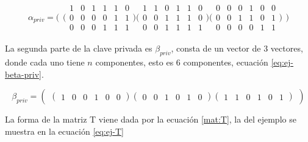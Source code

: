 \begin{equation}\label{eq:ej-alpha-priv}
{\alpha_{priv}} = 
	\Bigg(\begin{matrix}
	\Big(\begin{smallmatrix}
		1 & 0 & 1 & 1 & 1 & 0\\
		0 & 0 & 0 & 0 & 1 & 1\\
		0 & 0 & 0 & 1 & 1 & 1
	\end{smallmatrix}\Big)
		
	\Big(\begin{smallmatrix}
		1 & 1 & 0 & 1 & 1 & 0\\
		0 & 0 & 1 & 1 & 1 & 0\\
		0 & 0 & 1 & 1 & 1 & 1
	\end{smallmatrix}\Big)
	
	\Big(\begin{smallmatrix}
		0 & 0 & 0 & 1 & 0 & 0\\
		0 & 0 & 1 & 1 & 0 & 1\\
		0 & 0 & 0 & 0 & 1 & 1
	\end{smallmatrix}\Big)
	\end{matrix}\Bigg)
\end{equation}

La segunda parte de la clave privada es $\beta_{priv}$, consta de un vector de $3$ vectores, donde cada uno tiene $n$ componentes, esto es $6$ componentes, ecuación \ref{eq:ej-beta-priv}.

\begin{equation}\label{eq:ej-beta-priv}
{\beta_{priv}} = 
	\left(\begin{matrix}
		\left(\begin{smallmatrix}
			1 & 0 & 0 & 1 & 0 & 0
		\end{smallmatrix}\right)
	
		\left(\begin{smallmatrix}
			0 & 0 & 1 & 0 & 1 & 0
		\end{smallmatrix}\right)
	
		\left(\begin{smallmatrix}
			1 & 1 & 0 & 1 & 0 & 1
		\end{smallmatrix}\right)
	\end{matrix}\right)
\end{equation}


La forma de la matriz T viene dada por la ecuación \ref{mat:T}, la del ejemplo se muestra en la ecuación \ref{eq:ej-T}

